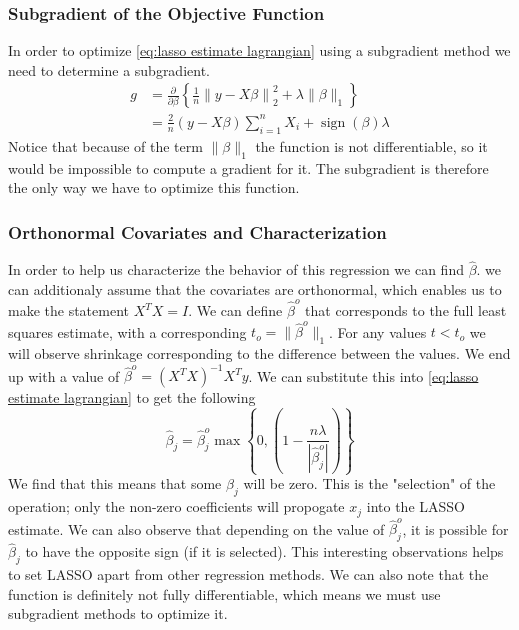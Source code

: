 \documentclass[journal,onecolumn]{IEEEtran}
\DeclareMathOperator{\sign}{sign}
\begin{document}
\subsubsection{Subgradient of the Objective Function}
In order to optimize \eqref{eq:lasso estimate lagrangian} using a subgradient method we need to determine a subgradient.
\begin{equation}\label{eq:lasso subgradient}
\begin{aligned}
g &= \frac{\partial}{\partial \beta} \left\{ \frac{1}{n}\left\|y-X \beta\right\|^2_2 + \lambda \|\beta\|_1 \right\} \\
&= \frac{2}{n} (y - X \beta) \sum_{i=1}^n X_i + \sign (\beta) \lambda 
\end{aligned}
\end{equation}
Notice that because of the term \(\|\beta\|_1\) the function is not differentiable, so it would be impossible to compute a gradient for it. The subgradient is therefore the only way we have to optimize this function.

\subsubsection{Orthonormal Covariates and Characterization}
In order to help us characterize the behavior of this regression we can find \(\hat{\beta}\). we can additionaly assume that the covariates are orthonormal, which enables us to make the statement \(X^T X = I\). We can define \(\hat{\beta}^o\) that corresponds to the full least squares estimate, with a corresponding \(t_o = \|\hat{\beta}^o\|_1\). For any values \(t < t_o\) we will observe shrinkage corresponding to the difference between the values. We end up with a value of \(\hat{\beta}^o = (X^T X)^{-1} X^T y\). We can substitute this into \eqref{eq:lasso estimate lagrangian} to get the following
\begin{equation}\label{eq:lasso beta}
\hat{\beta}_j = \hat{\beta}^o_j \max \left\{0, \left(1-\frac{n\lambda}{|\hat{\beta}^o_j|}\right)\right\}
\end{equation}
We find that this means that some \(\beta_j\) will be zero. This is the "selection" of the operation; only the non-zero coefficients will propogate \(x_j\) into the LASSO estimate. We can also observe that depending on the value of \(\hat{\beta}^o_j\), it is possible for \(\hat{\beta}_j\) to have the opposite sign (if it is selected). This interesting observations helps to set LASSO apart from other regression methods. We can also note that the function is definitely not fully differentiable, which means we must use subgradient methods to optimize it.
\end{document}

